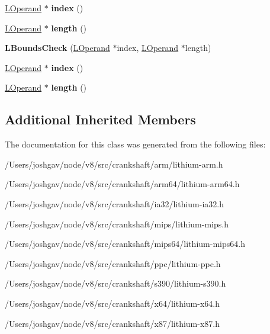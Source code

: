 \begin{DoxyCompactItemize}
\item 
\hyperlink{classv8_1_1internal_1_1_l_operand}{L\+Operand} $\ast$ {\bfseries index} ()\hypertarget{classv8_1_1internal_1_1_l_bounds_check_a5a196dda5bfbf1b5f2a1e364ea90b480}{}\label{classv8_1_1internal_1_1_l_bounds_check_a5a196dda5bfbf1b5f2a1e364ea90b480}

\item 
\hyperlink{classv8_1_1internal_1_1_l_operand}{L\+Operand} $\ast$ {\bfseries length} ()\hypertarget{classv8_1_1internal_1_1_l_bounds_check_a984c32ba47d1a32eb80724a02fb9743f}{}\label{classv8_1_1internal_1_1_l_bounds_check_a984c32ba47d1a32eb80724a02fb9743f}

\item 
{\bfseries L\+Bounds\+Check} (\hyperlink{classv8_1_1internal_1_1_l_operand}{L\+Operand} $\ast$index, \hyperlink{classv8_1_1internal_1_1_l_operand}{L\+Operand} $\ast$length)\hypertarget{classv8_1_1internal_1_1_l_bounds_check_a7d14ce8d0fef3c0c1ea9a7bc08b55758}{}\label{classv8_1_1internal_1_1_l_bounds_check_a7d14ce8d0fef3c0c1ea9a7bc08b55758}

\item 
\hyperlink{classv8_1_1internal_1_1_l_operand}{L\+Operand} $\ast$ {\bfseries index} ()\hypertarget{classv8_1_1internal_1_1_l_bounds_check_a5a196dda5bfbf1b5f2a1e364ea90b480}{}\label{classv8_1_1internal_1_1_l_bounds_check_a5a196dda5bfbf1b5f2a1e364ea90b480}

\item 
\hyperlink{classv8_1_1internal_1_1_l_operand}{L\+Operand} $\ast$ {\bfseries length} ()\hypertarget{classv8_1_1internal_1_1_l_bounds_check_a984c32ba47d1a32eb80724a02fb9743f}{}\label{classv8_1_1internal_1_1_l_bounds_check_a984c32ba47d1a32eb80724a02fb9743f}

\end{DoxyCompactItemize}
\subsection*{Additional Inherited Members}


The documentation for this class was generated from the following files\+:\begin{DoxyCompactItemize}
\item 
/\+Users/joshgav/node/v8/src/crankshaft/arm/lithium-\/arm.\+h\item 
/\+Users/joshgav/node/v8/src/crankshaft/arm64/lithium-\/arm64.\+h\item 
/\+Users/joshgav/node/v8/src/crankshaft/ia32/lithium-\/ia32.\+h\item 
/\+Users/joshgav/node/v8/src/crankshaft/mips/lithium-\/mips.\+h\item 
/\+Users/joshgav/node/v8/src/crankshaft/mips64/lithium-\/mips64.\+h\item 
/\+Users/joshgav/node/v8/src/crankshaft/ppc/lithium-\/ppc.\+h\item 
/\+Users/joshgav/node/v8/src/crankshaft/s390/lithium-\/s390.\+h\item 
/\+Users/joshgav/node/v8/src/crankshaft/x64/lithium-\/x64.\+h\item 
/\+Users/joshgav/node/v8/src/crankshaft/x87/lithium-\/x87.\+h\end{DoxyCompactItemize}
